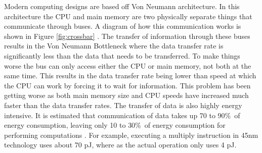 \documentclass{sig-alternate}
\begin{document}
Modern computing designs are based off Von Neumann architecture.  In this architecture the CPU and main memory are two physically separate things that communicate through buses.  A diagram of how this communication works is shown in Figure \ref{fig:crossbar} \cite{vonnewt}.  The transfer of information through these buses results in the Von Neumann Bottleneck where the data transfer rate is significantly less than the data that needs to be transferred.  To make things worse the bus can only access either the CPU or main memory, not both at the same time.  This results in the data transfer rate being lower than speed at which the CPU can work by forcing it to wait for information.  This problem has been getting worse as both main memory size and CPU speeds have increased much faster than the data transfer rates.  The transfer of data is also highly energy intensive.  It is estimated that communication of data takes up 70 to 90\%\ of energy consumption, leaving only 10 to 30\%\ of energy consumption for performing computations              \cite{Hamdioui:2015:MBC:2755753.2757210}.  For example, executing a multiply instruction in 45nm technology uses about 70 pJ, where as the actual operation only uses 4 pJ.
\end{document}
